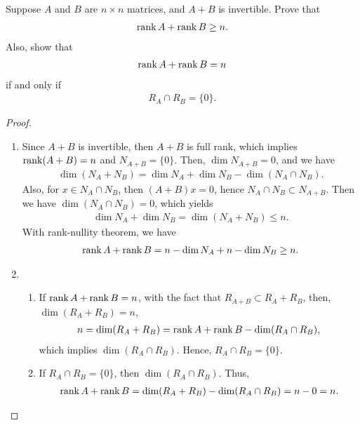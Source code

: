 \documentclass[12pt]{article}
\begin{document}
Suppose $A$ and $B$ are $n \times n$ matrices, and $A + B$ is invertible. Prove that
\begin{align*}
    \rank A + \rank B \geq n.
\end{align*}
Also, show that
\begin{align*}
    \rank A + \rank B = n
\end{align*}
if and only if
\begin{align*}
    R_A \cap R_B = \{0\}.
\end{align*}
\begin{proof}
~\begin{enumerate}[label=(\alph*)]
    \item Since $A + B$ is invertible, then $A + B$ is full rank, which implies $\rank (A+B) = n$ and $N_{A+B} = \{0\}$. Then, $\dim N_{A+B} = 0$, and we have
    \begin{align*}
        \dim (N_A + N_B) = \dim N_A + \dim N_B - \dim (N_A \cap N_B).
    \end{align*}
    Also, for $x\in N_A \cap N_B$, then $(A + B)x = 0$, hence $N_A \cap N_B \subset N_{A+B}$. Then we have $\dim (N_A \cap N_B) = 0$, which yields
    \begin{align*}
        \dim N_A + \dim N_B = \dim (N_A + N_B) \leq n.
    \end{align*}
    With rank-nullity theorem, we have
    \begin{align*}
        \rank A + \rank B = n - \dim N_A + n - \dim N_B \geq n.
    \end{align*}

    \item \begin{enumerate}[label=\arabic*)]
        \item If $\rank A + \rank B = n$, with the fact that $R_{A+B} \subset R_A + R_B$, then, $\dim (R_A + R_B) = n$,
        \begin{align*}
            n = \dim (R_A + R_B) = \rank A + \rank B - \dim (R_A \cap R_B),
        \end{align*}
        which implies $\dim (R_A \cap R_B)$. Hence, $R_A \cap R_B = \{0\}$.

        \item If $R_A \cap R_B = \{0\}$, then $\dim (R_A \cap R_B)$. Thus,
        \begin{align*}
            \rank A + \rank B = \dim (R_A + R_B) - \dim (R_A \cap R_B) = n - 0 = n.
        \end{align*}
    \end{enumerate}
\end{enumerate}
\end{proof}
\end{document}
